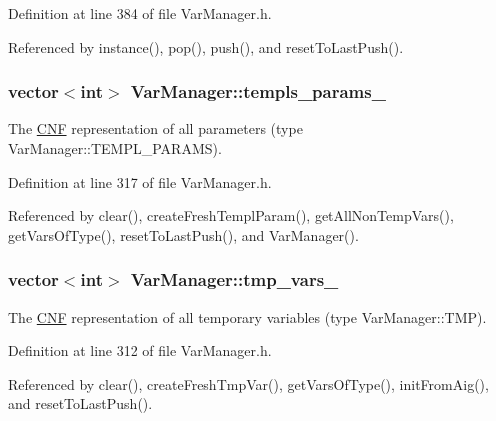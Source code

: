 Definition at line 384 of file Var\-Manager.\-h.



Referenced by instance(), pop(), push(), and reset\-To\-Last\-Push().

\hypertarget{classVarManager_aea1a2e16d5a0ff433d47a4f28cc2ae3b}{
\subsubsection[{templs\-\_\-params\-\_\-}]{\setlength{\rightskip}{0pt plus 5cm}vector$<$int$>$ Var\-Manager\-::templs\-\_\-params\-\_\-\hspace{0.3cm}{\ttfamily [protected]}}}\label{classVarManager_aea1a2e16d5a0ff433d47a4f28cc2ae3b}


The \hyperlink{classCNF}{C\-N\-F} representation of all parameters (type Var\-Manager\-::\-T\-E\-M\-P\-L\-\_\-\-P\-A\-R\-A\-M\-S). 



Definition at line 317 of file Var\-Manager.\-h.



Referenced by clear(), create\-Fresh\-Templ\-Param(), get\-All\-Non\-Temp\-Vars(), get\-Vars\-Of\-Type(), reset\-To\-Last\-Push(), and Var\-Manager().

\hypertarget{classVarManager_aa22f9522aa27237a2dee30503c20e45f}{
\subsubsection[{tmp\-\_\-vars\-\_\-}]{\setlength{\rightskip}{0pt plus 5cm}vector$<$int$>$ Var\-Manager\-::tmp\-\_\-vars\-\_\-\hspace{0.3cm}{\ttfamily [protected]}}}\label{classVarManager_aa22f9522aa27237a2dee30503c20e45f}


The \hyperlink{classCNF}{C\-N\-F} representation of all temporary variables (type Var\-Manager\-::\-T\-M\-P). 



Definition at line 312 of file Var\-Manager.\-h.



Referenced by clear(), create\-Fresh\-Tmp\-Var(), get\-Vars\-Of\-Type(), init\-From\-Aig(), and reset\-To\-Last\-Push().

